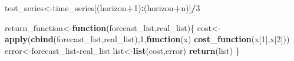 \documentclass[
]{article}
\newenvironment{Shaded}{\begin{snugshade}}{\end{snugshade}}
\newcommand{\ControlFlowTok}[1]{\textcolor[rgb]{0.13,0.29,0.53}{\textbf{#1}}}
\newcommand{\DecValTok}[1]{\textcolor[rgb]{0.00,0.00,0.81}{#1}}
\newcommand{\KeywordTok}[1]{\textcolor[rgb]{0.13,0.29,0.53}{\textbf{#1}}}
\newcommand{\NormalTok}[1]{#1}
\newcommand{\OperatorTok}[1]{\textcolor[rgb]{0.81,0.36,0.00}{\textbf{#1}}}
\begin{document}
\begin{Shaded}
\begin{Highlighting}[]
\NormalTok{test_series<-time_series[(horizon}\OperatorTok{+}\DecValTok{1}\NormalTok{)}\OperatorTok{:}\NormalTok{(horizon}\OperatorTok{+}\NormalTok{n)]}\OperatorTok{/}\DecValTok{3}

\NormalTok{return_function<-}\ControlFlowTok{function}\NormalTok{(forecast_list,real_list)\{}
\NormalTok{  cost<-}\KeywordTok{apply}\NormalTok{(}\KeywordTok{cbind}\NormalTok{(forecast_list,real_list),}\DecValTok{1}\NormalTok{,}\ControlFlowTok{function}\NormalTok{(x) }\KeywordTok{cost_function}\NormalTok{(x[}\DecValTok{1}\NormalTok{],x[}\DecValTok{2}\NormalTok{]))}
\NormalTok{  error<-forecast_list}\OperatorTok{-}\NormalTok{real_list}
\NormalTok{  list<-}\KeywordTok{list}\NormalTok{(cost,error)}
  \KeywordTok{return}\NormalTok{(list)}
\NormalTok{\}}



\end{Highlighting}
\end{Shaded}
\end{document}
